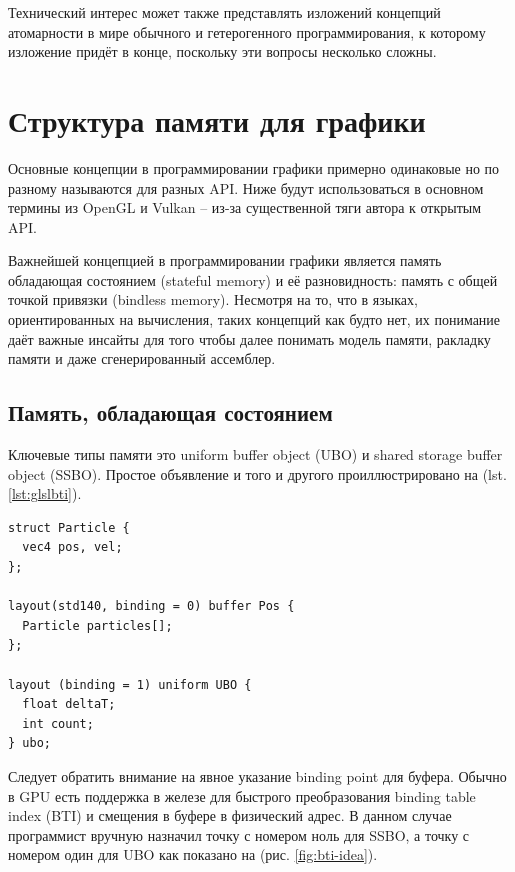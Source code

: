 \documentclass[a4paper,12pt,oneside]{article}
\begin{document}
Технический интерес может также представлять изложений концепций атомарности в мире обычного и гетерогенного программирования, к которому изложение придёт в конце, поскольку эти вопросы несколько сложны.

\pagebreak
\section{Структура памяти для графики}\label{sec:GPUMEM}

Основные концепции в программировании графики примерно одинаковые но по разному называются для разных API. Ниже будут использоваться в основном термины из OpenGL и Vulkan -- из-за существенной тяги автора к открытым API. 

Важнейшей концепцией в программировании графики является память обладающая состоянием (stateful memory) и её разновидность: память с общей точкой привязки (bindless memory). 
Несмотря на то, что в языках, ориентированных на вычисления, таких концепций как будто нет, их понимание даёт важные инсайты для того чтобы далее понимать модель памяти, ракладку памяти и даже сгенерированный ассемблер.

\subsection{Память, обладающая состоянием}\label{subsec:stateful}

Ключевые типы памяти это uniform buffer object (UBO) и shared storage buffer object (SSBO). Простое объявление и того и другого проиллюстрировано на (lst. \ref{lst:glslbti}).

\begin{lstlisting}[caption={Простая программа на GLSL с явными binding индексами},label={lst:glslbti}]
struct Particle {
  vec4 pos, vel;
};

layout(std140, binding = 0) buffer Pos {
  Particle particles[];
};

layout (binding = 1) uniform UBO {
  float deltaT; 
  int count;
} ubo;
\end{lstlisting}

Следует обратить внимание на явное указание binding point для буфера. Обычно в GPU есть поддержка в железе для быстрого преобразования binding table index (BTI) и смещения в буфере в физический адрес. В данном случае программист вручную назначил точку с номером ноль для SSBO, а точку с номером один для UBO как показано на (рис. \ref{fig:bti-idea}).
\end{document}

